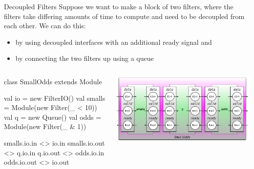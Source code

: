 \documentclass[xcolor=pdflatex,dvipsnames,table]{beamer}
\begin{document}
\begin{frame}[fragile]{Decoupled Filters}
Suppose we want to make a block of two filters, where the filters take differing amounts of time to compute and need to be decoupled from each other.
We can do this:
\begin{itemize}
\item by using decoupled interfaces with an additional ready signal and
\item by connecting the two filters up using a queue
\end{itemize}

\begin{columns}

{
\begin{scala}
class SmallOdds extends Module { 
  val io     = new FilterIO()
  val smalls = Module(new Filter(_ < 10))
  val q      = new Queue()
  val odds   = Module(new Filter(_ & 1))

  smalls.io.in  <> io.in
  smalls.io.out <> q.io.in
  q.io.out      <> odds.io.in
  odds.io.out   <> io.out
}
\end{scala}
}


\begin{center}
\includegraphics[width=1.0\textwidth]{figs/decoupled-block.pdf} 
\end{center}

\end{columns}

\end{frame}
\end{document}
